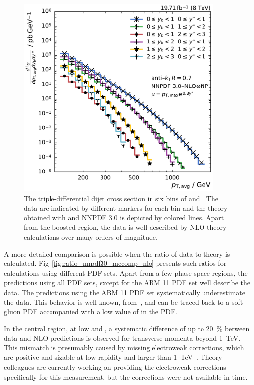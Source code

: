 \begin{figure}[h!tbp]
    \centering
    \includegraphics[width=0.9\textwidth]{figures/measurement/ptavg_spectrum.pdf}\hfill
    \caption[Spectrum of the triple-differential dijet cross section]{The
    triple-differential dijet cross section in six bins of \ystar and \yboost. The
    data are indicated by different markers for each bin and the theory obtained
    with \NLOJETPP and NNPDF 3.0 is depicted by colored lines. Apart from the
    boosted region, the data is well described by NLO theory calculations over many orders of magnitude.}
    \label{fig:measurement_result}
\end{figure}

A more detailed comparison is possible when the ratio of data to theory is
calculated. Fig~\ref{fig:ratio_nnpdf30_mccomp_nlo} presents
such ratios for calculations using different PDF sets. Apart
from a few phase space regions, the predictions using all PDF sets, except for
the ABM 11 PDF set well describe the data. The predictions using the ABM 11 PDF
set systematically underestimate the data. This behavior is well known, \eg
from~\cite{Khachatryan:2014waa,Stober:2012abc}, and can be traced back to a
soft gluon PDF accompanied with a low value of \asmz in the PDF.

In the central region, at low \yboost and \ystar, a systematic difference of up
to \SI{20}{\percent} between data and NLO predictions is observed for transverse
momenta beyond \SI{1}{\TeV}. This mismatch is presumably caused by missing electroweak
corrections, which are positive and sizable at low rapidity and \pt larger
than \SI{1}{\TeV}~\cite{Dittmaier:2012kx,Khachatryan:2014waa}. Theory colleagues are currently working on providing the
electroweak corrections specifically for this measurement, but the corrections
were not available in time.

